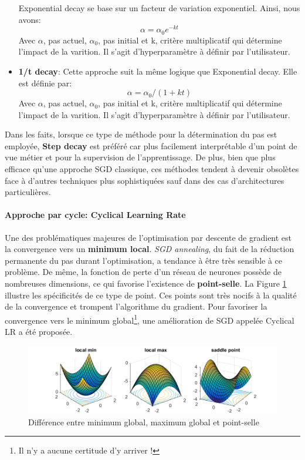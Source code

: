 \begin{itemize}
    Exponential decay se base sur un facteur de variation exponentiel. Ainsi, nous avons:
    $$\alpha = \alpha_0 e^{-k t}$$
    \noindent Avec $\alpha$, pas actuel, $\alpha_0$, pas initial et k, critère multiplicatif qui détermine l'impact de la varition. Il s'agit d'hyperparamètre à définir par l'utilisateur.

    \item \textbf{1/t decay}: Cette approche suit la même logique que Exponential decay. Elle est définie par:
    $$\alpha = \alpha_0 / (1 + k t )$$
    \noindent Avec $\alpha$, pas actuel, $\alpha_0$, pas initial et k, critère multiplicatif qui détermine l'impact de la varition. Il s'agit d'hyperparamètre à définir par l'utilisateur.
\end{itemize}

\noindent Dans les faits, lorsque ce type de méthode pour la détermination du pas est employée, \textbf{Step decay} est préféré car plus facilement interprétable d'un point de vue métier et pour la supervision de l'apprentissage. De plus, bien que plus efficace qu'une approche SGD classique, ces méthodes tendent à devenir obsolètes face à d'autres techniques plus sophistiquées sauf dans des cas d'architectures particulières.

\paragraph{Approche par cycle: Cyclical Learning Rate}
\noindent Une des problématiques majeures de l'optimisation par descente de gradient est la convergence vers un \textbf{minimum local}. \textit{SGD annealing}, du fait de la réduction permanente du pas durant l'optimisation, a tendance à être très sensible à ce problème. De même, la fonction de perte d'un réseau de neurones possède de nombreuses dimensions, ce qui favorise l'existence de \textbf{point-selle}. La Figure \ref{point_selle_pic} illustre les spécificités de ce type de point. Ces points sont très nocifs à la qualité de la convergence et trompent l'algorithme du gradient. Pour favoriser la convergence vers le minimum global\footnote{Il n'y a aucune certitude d'y arriver !}, une amélioration de SGD appelée Cyclical LR\cite{cyclicallr} a été proposée.\\

\begin{figure}
    \centering
    \includegraphics[scale=0.45]{./tex/fondamentaux/minmaxsaddle.png}
    \caption{Différence entre minimum global, maximum global et point-selle}
    \label{point_selle_pic}
\end{figure}

